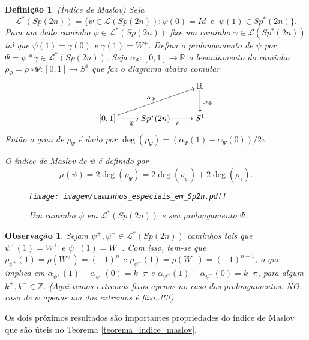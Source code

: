 \documentclass[12pt]{book}
\newtheorem{definicao}[teorema]{Definição}
\newtheorem{observacao}[teorema]{Observação}
\newcommand{\caminhosespeciais}[1]{\mathcal{L}^{*}(#1)}
\newcommand{\caminhos}{\mathcal{L}}
\newcommand{\circulo}{S^{1}}
\newcommand{\dominioMaslov}{\caminhos^{*}(\gruposimpletico{2n})}
\newcommand{\gruposimpletico}[1]{Sp(#1)}
\newcommand{\gruposimpleticonaodegenerado}[1]{Sp^{#1}(2n)}
\newcommand{\inteiros}{\mathbb{Z}}
\newcommand{\intervalo}{[0,1]}
\newcommand{\real}[1]{\mathbb{R}^{#1}}
\newcommand{\reta}{\real{}}
\newcommand{\alerta}[1]{{\color{red}#1}}
\begin{document}
	\begin{definicao}
		(Índice de Maslov) 
		Seja 
		$$
		\dominioMaslov=\{ \psi \in \caminhos(\gruposimpletico{2n}): \psi(0)=Id \;\; \text{e}\;\; \psi(1)\in \gruposimpleticonaodegenerado{*}\}.
		$$
		Para um dado caminho $\psi \in \dominioMaslov$ fixe um caminho $\gamma \in \caminhos(\gruposimpleticonaodegenerado{*})$ tal que $\psi(1)=\gamma(0)$ e $\gamma(1)=W^{\pm}$. Defina o prolongamento de $\psi$ por $\Psi = \psi*\gamma \in   \dominioMaslov$. Seja $\alpha_{\Psi}: \intervalo \to \reta$ o levantamento do caminho $\rho_{\Psi} = \rho \circ \Psi:\intervalo\to \circulo$ que faz o diagrama abaixo comutar
		$$
		\xymatrix{
			& & \real{}\ar[d]\ar[d]^{\text{exp}}
			\\
			[0,1 ]\ar[urr]^{\alpha_{\Psi}} \ar[r]_{\Psi} & \gruposimpleticonaodegenerado{*} \ar[r]_{\rho} & S^{1}
		}
		$$	
		Então o grau de $\rho_{\Psi}$ é dado por $\deg(\rho_{\Psi}) = (\alpha_{\Psi}(1)-\alpha_{\Psi}(0))/2\pi$. 
		
		O índice de Maslov de $\psi$ é definido por
		$$
		\mu(\psi)= 2\deg(\rho_{\Psi}) = 2\deg(\rho_{\psi}) + 2\deg(\rho_{\gamma}).
		$$
		\begin{figure}[!h]
			\centering
			\texttt{[image: imagem/caminhos\_especiais\_em\_Sp2n.pdf]}
			\caption{Um caminho $\psi$ em $\caminhosespeciais{\gruposimpletico{2n}}$ e seu prolongamento $\Psi$.}
		\end{figure}
	\end{definicao}
	
	\begin{observacao}
		Sejam $\psi^{+}, \psi^{-} \in  \caminhosespeciais{\gruposimpletico{2n}}$ caminhos tais que $\psi^{+}(1)=W^{+}$ e $\psi^{-}(1)=W^{-}$. Com isso, tem-se que $\rho_{\psi^{+}}(1) =\rho(W^{+}) = (-1)^{n}$ e $\rho_{\psi^{-}}(1) =\rho(W^{-}) = (-1)^{n-1}$, o que implica em $\alpha_{\psi^{+}}(1)-\alpha_{\psi^{+}}(0) = k^{+}\pi$ e $\alpha_{\psi^{-}}(1)-\alpha_{\psi^{-}}(0) = k^{-}\pi$, para algum $k^{+}, k^{-}\in \inteiros$.
		\alerta{(Aqui temos extremos fixos apenas no caso dos prolongamentos. NO caso de $\psi$ apenas um dos extremos é fixo..!!!!)}
	\end{observacao}
	
	Os dois próximos resultados são importantes propriedades do índice de Maslov que são úteis no Teorema \ref{teorema_indice_maslov}.
\end{document}
